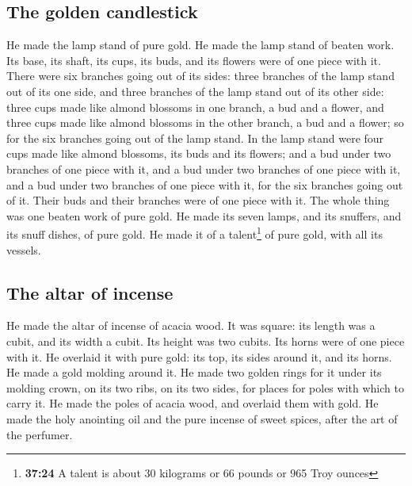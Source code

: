 \hypertarget{the-golden-candlestick}{%
\subsection{The golden candlestick}\label{the-golden-candlestick}}

 He made the lamp stand of pure gold. He made the lamp
stand of beaten work. Its base, its shaft, its cups, its buds, and its
flowers were of one piece with it.  There were six
branches going out of its sides: three branches of the lamp stand out of
its one side, and three branches of the lamp stand out of its other
side:  three cups made like almond blossoms in one
branch, a bud and a flower, and three cups made like almond blossoms in
the other branch, a bud and a flower; so for the six branches going out
of the lamp stand.  In the lamp stand were four cups made
like almond blossoms, its buds and its flowers;  and a
bud under two branches of one piece with it, and a bud under two
branches of one piece with it, and a bud under two branches of one piece
with it, for the six branches going out of it.  Their
buds and their branches were of one piece with it. The whole thing was
one beaten work of pure gold.  He made its seven lamps,
and its snuffers, and its snuff dishes, of pure gold.  He
made it of a talent\footnote{\textbf{37:24} A talent is about 30
  kilograms or 66 pounds or 965 Troy ounces} of pure gold, with all its
vessels.

\hypertarget{the-altar-of-incense}{%
\subsection{The altar of incense}\label{the-altar-of-incense}}

 He made the altar of incense of acacia wood. It was
square: its length was a cubit, and its width a cubit. Its height was
two cubits. Its horns were of one piece with it.  He
overlaid it with pure gold: its top, its sides around it, and its horns.
He made a gold molding around it.  He made two golden
rings for it under its molding crown, on its two ribs, on its two sides,
for places for poles with which to carry it.  He made the
poles of acacia wood, and overlaid them with gold.  He
made the holy anointing oil and the pure incense of sweet spices, after
the art of the perfumer.

